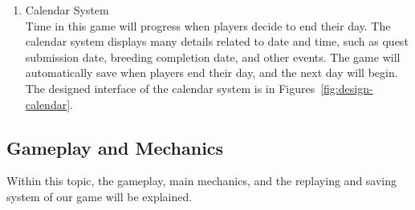 \documentclass[12pt,oneside,openright,a4paper]{cpe-english-project}
\begin{document}
\begin{itemize}
\begin{enumerate}
	\item Calendar System \\
	Time in this game will progress when players decide to end their day. The calendar system displays many details related to date and time, such as quest submission date, breeding completion date, and other events. The game will automatically save when players end their day, and the next day will begin. The designed interface of the calendar system is in Figures~\ref{fig:design-calendar}. \\
	\begin{minipage}[c]{\textwidth}\centering
	\label{fig:design-calendar}
	\end{minipage}
\end{enumerate}

\end{itemize}

\subsection{Gameplay and Mechanics}
Within this topic, the gameplay, main mechanics, and the replaying and saving system of our game will be explained.
\end{document}
